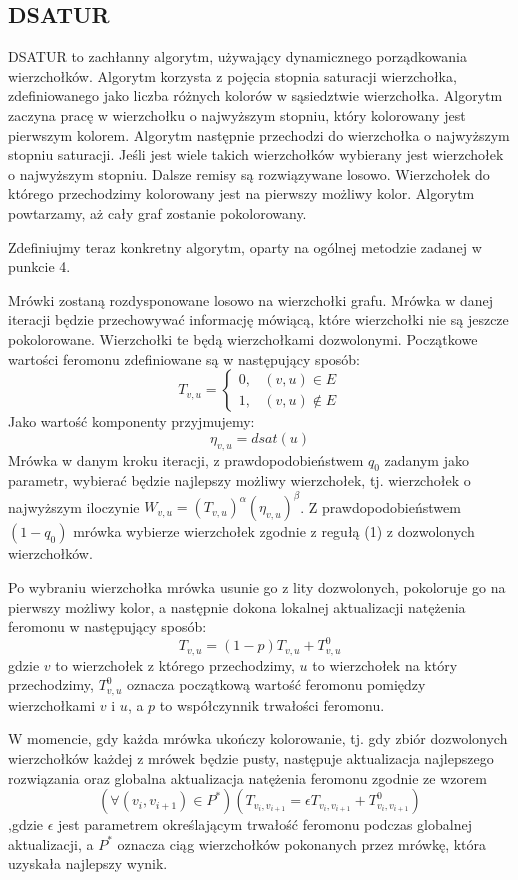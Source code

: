 \documentclass[11pt]{article}
\begin{document}
\subsection{DSATUR}
DSATUR to zachłanny algorytm, używający dynamicznego porządkowania wierzchołków. Algorytm korzysta z pojęcia stopnia saturacji wierzchołka, zdefiniowanego jako liczba różnych kolorów w sąsiedztwie wierzchołka. Algorytm zaczyna pracę w wierzchołku o najwyższym stopniu, który kolorowany jest pierwszym kolorem. Algorytm następnie przechodzi do wierzchołka o najwyższym stopniu saturacji. Jeśli jest wiele takich wierzchołków wybierany jest wierzchołek o najwyższym stopniu. Dalsze remisy są rozwiązywane losowo. Wierzchołek do którego przechodzimy kolorowany jest na pierwszy możliwy kolor. Algorytm powtarzamy, aż cały graf zostanie pokolorowany. 

Zdefiniujmy teraz konkretny algorytm, oparty na ogólnej metodzie zadanej w punkcie 4. 

Mrówki zostaną rozdysponowane losowo na wierzchołki grafu. Mrówka w danej iteracji będzie przechowywać informację mówiącą, które wierzchołki nie są jeszcze pokolorowane. Wierzchołki te będą wierzchołkami dozwolonymi. Początkowe wartości feromonu zdefiniowane są w następujący sposób:
$$
T_{v, u}=
\begin{cases}
0, & (v, u) \in E\\
1, & (v, u) \notin E
\end{cases}
$$
Jako wartość komponenty przyjmujemy:
$$
\eta_{v,u} = dsat(u)
$$
Mrówka w danym kroku iteracji, z prawdopodobieństwem $q_0$ zadanym jako parametr, wybierać będzie najlepszy możliwy wierzchołek, tj. wierzchołek o najwyższym iloczynie $W_{v,u} = (T_{v,u})^{\alpha}  (\eta_{v,u})^{\beta}$. Z prawdopodobieństwem $(1 - q_0)$ mrówka wybierze wierzchołek zgodnie z regułą (1) z dozwolonych wierzchołków.

Po wybraniu wierzchołka mrówka usunie go z lity dozwolonych, pokoloruje go na pierwszy możliwy kolor, a następnie  dokona lokalnej aktualizacji natężenia feromonu w następujący sposób:
\begin{equation}
T_{v,u} = (1 - p) T_{v,u} + T^0_{v,u} 
\end{equation}
gdzie $v$ to wierzchołek z którego przechodzimy, $u$ to wierzchołek na który przechodzimy, $T^0_{v,u} $ oznacza początkową wartość feromonu pomiędzy wierzchołkami $v$ i $u$, a $p$ to współczynnik trwałości feromonu.

W momencie, gdy każda mrówka ukończy kolorowanie, tj. gdy zbiór dozwolonych wierzchołków każdej z mrówek będzie pusty, następuje aktualizacja najlepszego rozwiązania oraz globalna aktualizacja natężenia feromonu zgodnie ze wzorem 
\begin{equation}
(\forall (v_i, v_{i+1}) \in P^{*})  (T_{v_i,v_{i+1}} = \epsilon T_{v_i,v_{i+1}} + T^0_{v_i,v_{i+1}})
\end{equation}
,gdzie $\epsilon$ jest parametrem określającym trwałość feromonu podczas globalnej aktualizacji, a  $P^{*}$ oznacza ciąg wierzchołków pokonanych przez mrówkę, która uzyskała najlepszy wynik.
\end{document}
